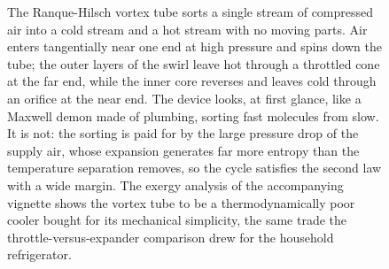 \begin{figure}[htbp]
\centering
{}
\caption[Schematic of a Ranque-Hilsch vortex tube]{The Ranque-Hilsch vortex
tube sorts a single stream of compressed air into a cold stream and a hot
stream with no moving parts. Air enters tangentially near one end at high
pressure and spins down the tube; the outer layers of the swirl leave hot
through a throttled cone at the far end, while the inner core reverses and
leaves cold through an orifice at the near end. The device looks, at first
glance, like a Maxwell demon made of plumbing, sorting fast molecules from
slow. It is not: the sorting is paid for by the large pressure drop of the
supply air, whose expansion generates far more entropy than the temperature
separation removes, so the cycle satisfies the second law with a wide margin.
The exergy analysis of the accompanying vignette shows the vortex tube to be a
thermodynamically poor cooler bought for its mechanical simplicity, the same
trade the throttle-versus-expander comparison drew for the household
refrigerator.}
\label{fig:vol04ch04:vortex-tube}
\end{figure}
